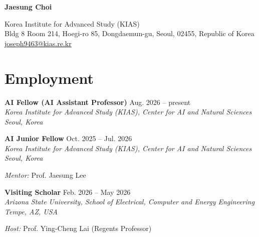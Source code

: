 \documentclass[11pt,a4paper]{article}
\newcommand{\cventry}[4]{
    \noindent\textbf{#1} \hfill #2 \\
    \textit{#3} \hfill \textit{#4}
}
\begin{document}
\begin{center}
    {\Huge\bfseries\color{titlecolor} Jaesung Choi}
    
    \vspace{0.3em}
    
    Korea Institute for Advanced Study (KIAS) \\
    Bldg 8 Room 214, Hoegi-ro 85, Dongdaemun-gu, Seoul, 02455, Republic of Korea \\
    {\small \Letter} \hspace{0.1em} \href{mailto:joseph9463@kias.re.kr}{joseph9463@kias.re.kr}
\end{center}

\vspace{0.5em}

\section*{Employment}

\cventry{AI Fellow (AI Assistant Professor)}{Aug. 2026 -- present}
{Korea Institute for Advanced Study (KIAS), Center for AI and Natural Sciences}{Seoul, Korea}

\vspace{0.3em}

\cventry{AI Junior Fellow}{Oct. 2025 -- Jul. 2026}
{Korea Institute for Advanced Study (KIAS), Center for AI and Natural Sciences}{Seoul, Korea}
\vspace{1pt}
{\small \hspace*{1.2em} \textit{Mentor:} Prof. Jaesung Lee}

\vspace{0.3em}

\cventry{Visiting Scholar}{Feb. 2026 -- May 2026}
{Arizona State University, School of Electrical, Computer and Energy Engineering}{Tempe, AZ, USA}
\vspace{1pt}
{\small \hspace*{1.2em} \textit{Host:} Prof. Ying-Cheng Lai (Regents Professor)}

\vspace{0.3em}
\end{document}
